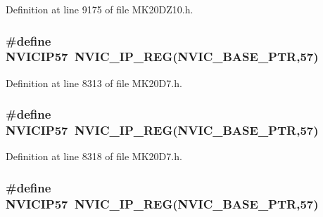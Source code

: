Definition at line 9175 of file M\+K20\+D\+Z10.\+h.

\subsubsection[{\texorpdfstring{N\+V\+I\+C\+I\+P57}{NVICIP57}}]{\setlength{\rightskip}{0pt plus 5cm}\#define N\+V\+I\+C\+I\+P57~{\bf N\+V\+I\+C\+\_\+\+I\+P\+\_\+\+R\+EG}({\bf N\+V\+I\+C\+\_\+\+B\+A\+S\+E\+\_\+\+P\+TR},57)}\hypertarget{group___n_v_i_c___register___accessor___macros_ga81b4b40a91d3bb425b3df511dcdb8328}{}\label{group___n_v_i_c___register___accessor___macros_ga81b4b40a91d3bb425b3df511dcdb8328}


Definition at line 8313 of file M\+K20\+D7.\+h.

\subsubsection[{\texorpdfstring{N\+V\+I\+C\+I\+P57}{NVICIP57}}]{\setlength{\rightskip}{0pt plus 5cm}\#define N\+V\+I\+C\+I\+P57~{\bf N\+V\+I\+C\+\_\+\+I\+P\+\_\+\+R\+EG}({\bf N\+V\+I\+C\+\_\+\+B\+A\+S\+E\+\_\+\+P\+TR},57)}\hypertarget{group___n_v_i_c___register___accessor___macros_ga81b4b40a91d3bb425b3df511dcdb8328}{}\label{group___n_v_i_c___register___accessor___macros_ga81b4b40a91d3bb425b3df511dcdb8328}


Definition at line 8318 of file M\+K20\+D7.\+h.

\subsubsection[{\texorpdfstring{N\+V\+I\+C\+I\+P57}{NVICIP57}}]{\setlength{\rightskip}{0pt plus 5cm}\#define N\+V\+I\+C\+I\+P57~{\bf N\+V\+I\+C\+\_\+\+I\+P\+\_\+\+R\+EG}({\bf N\+V\+I\+C\+\_\+\+B\+A\+S\+E\+\_\+\+P\+TR},57)}\hypertarget{group___n_v_i_c___register___accessor___macros_ga81b4b40a91d3bb425b3df511dcdb8328}{}\label{group___n_v_i_c___register___accessor___macros_ga81b4b40a91d3bb425b3df511dcdb8328}


